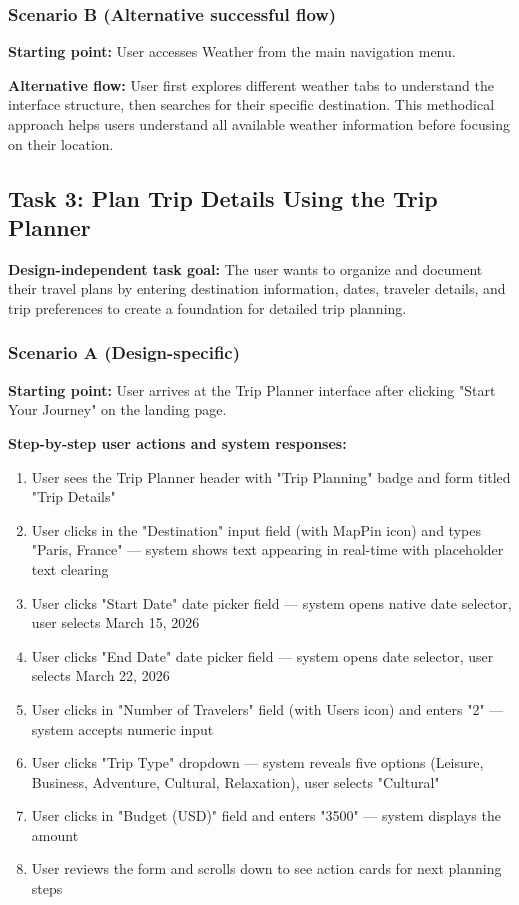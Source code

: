 \documentclass[11pt,a4paper]{article}
\begin{document}
\subsubsection*{Scenario B (Alternative successful flow)}

\textbf{Starting point:} User accesses Weather from the main navigation menu.

\textbf{Alternative flow:} User first explores different weather tabs to understand the interface structure, then searches for their specific destination. This methodical approach helps users understand all available weather information before focusing on their location.

\subsection*{Task 3: Plan Trip Details Using the Trip Planner}

\textbf{Design-independent task goal:}
The user wants to organize and document their travel plans by entering destination information, dates, traveler details, and trip preferences to create a foundation for detailed trip planning.

\subsubsection*{Scenario A (Design-specific)}

\textbf{Starting point:} User arrives at the Trip Planner interface after clicking "Start Your Journey" on the landing page.

\textbf{Step-by-step user actions and system responses:}
\begin{enumerate}
\item User sees the Trip Planner header with "Trip Planning" badge and form titled "Trip Details"
\item User clicks in the "Destination" input field (with MapPin icon) and types "Paris, France" — system shows text appearing in real-time with placeholder text clearing
\item User clicks "Start Date" date picker field — system opens native date selector, user selects March 15, 2026
\item User clicks "End Date" date picker field — system opens date selector, user selects March 22, 2026
\item User clicks in "Number of Travelers" field (with Users icon) and enters "2" — system accepts numeric input
\item User clicks "Trip Type" dropdown — system reveals five options (Leisure, Business, Adventure, Cultural, Relaxation), user selects "Cultural"
\item User clicks in "Budget (USD)" field and enters "3500" — system displays the amount
\item User reviews the form and scrolls down to see action cards for next planning steps
\end{enumerate}
\end{document}
